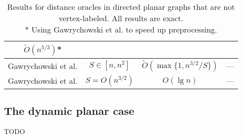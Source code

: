 \begin{table}[h!]
\begin{tabular}{c | c | c | c}
    $\tilde{O}(n^{5/3})$* \\
    \hline
    Gawrychowski et al. \cite{gawrychowski2017better} & $S\in [n, n^2]$ &
    $\tilde{O}(\max\{1, n^{3/2}/S\})$ & ---\\
    \hline
    Gawrychowski et al. \cite{gawrychowski2017better} & $S=O(n^{3/2})$ & $O(\lg n)$ & --- \\
    \hline
  \end{tabular}
  \caption{Results for distance oracles in directed planar graphs that are not
    vertex-labeled. All results are exact. \\
    * Using Gawrychowski et al. \cite{gawrychowski2018voronoi} to speed up
  preprocessing.}
  \label{planarresults}
\end{table}

\subsection{The dynamic planar case}
TODO
